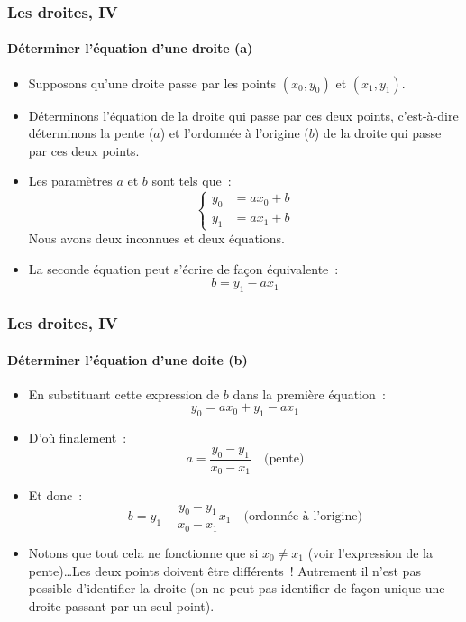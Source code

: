 \documentclass[10pt,notheorems]{beamer}
\theoremstyle{plain}
\theoremstyle{definition} %
\begin{document}
\begin{frame}
  \frametitle{Les droites, IV}
  \framesubtitle{Déterminer l'équation d'une droite (a)}
  \hypertarget{slide_droites_4_1}{}

  \bigskip

  \begin{itemize}

  \item Supposons qu'une droite passe par les points $(x_0,y_0)$ et $(x_1,y_1)$.\newline

  \item Déterminons l'équation de la droite qui passe par ces deux
    points, c'est-à-dire déterminons la pente ($a$) et l'ordonnée à
    l'origine ($b$) de la droite qui passe par ces deux points.\newline

  \item Les paramètres $a$ et $b$ sont tels que~:
    \[
      \begin{cases}
        y_0 &= a x_0 + b\\
        y_1 &= a x_1 + b
      \end{cases}
    \]
    Nous avons deux inconnues et deux équations.\newline

  \item La seconde équation peut s'écrire de façon équivalente~:
    \[
      b = y_1 - a x_1
    \]
  \end{itemize}

\end{frame}


\begin{frame}
  \frametitle{Les droites, IV}
  \framesubtitle{Déterminer l'équation d'une doite (b)}
  \hypertarget{slide_droites_4_2}{}

  \bigskip

  \begin{itemize}

  \item En substituant cette expression de $b$ dans la première équation~:
    \[
      y_0 = a x_0 +y_1 - a x_1
    \]

  \item D'où finalement~:
    \[
      a = \frac{y_0-y_1}{x_0-x_1}\quad\text{(pente)}
    \]

  \item Et donc~:
    \[
      b = y_1 - \frac{y_0-y_1}{x_0-x_1} x_1\quad\text{(ordonnée à l'origine)}
    \]

  \item Notons que tout cela ne fonctionne que si $x_0\neq x_1$ (voir l'expression de la pente)\ldots Les deux points doivent être différents~! Autrement il n'est pas possible d'identifier la droite (on ne peut pas identifier de façon unique une droite passant par un seul point).

  \end{itemize}

\end{frame}
\end{document}
